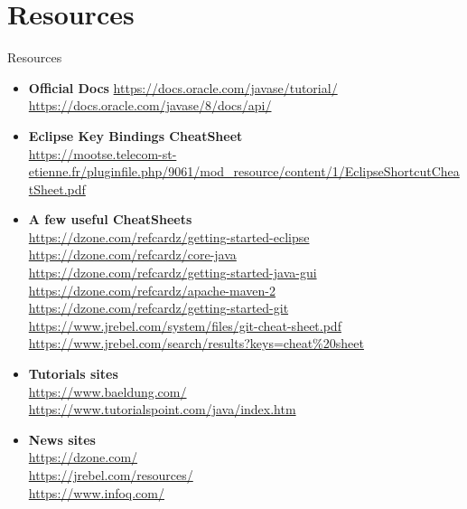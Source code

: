 \documentclass[English,c,%
hyperref={%
    pdftitle={FISA-DE2 OOP in Java},%
    pdfauthor={Muller, Gravier, Laforest, Subercaze},%
    pdfsubject={OOP in Java},%
    pdfkeywords={OOP, Java},%
    colorlinks=true,%
    urlcolor=blue,%
    linkcolor=%
    },%
xcolor={pdftex,svgnames} %
]{beamer}
\begin{document}
\section{Resources}

\begin{frame}{Resources}



{\tiny
\begin{itemize}

  \item \textbf{Official Docs}
  \url{https://docs.oracle.com/javase/tutorial/} \\
  \url{https://docs.oracle.com/javase/8/docs/api/}

  \item \textbf{Eclipse Key Bindings CheatSheet}\\
  \url{https://mootse.telecom-st-etienne.fr/pluginfile.php/9061/mod_resource/content/1/EclipseShortcutCheatSheet.pdf}

  \item \textbf{A few useful CheatSheets}\\
  \url{https://dzone.com/refcardz/getting-started-eclipse}\\
  \url{https://dzone.com/refcardz/core-java}\\
  \url{https://dzone.com/refcardz/getting-started-java-gui} \\
  \url{https://dzone.com/refcardz/apache-maven-2} \\
  \url{https://dzone.com/refcardz/getting-started-git} \\
  \url{https://www.jrebel.com/system/files/git-cheat-sheet.pdf}\\
  \url{https://www.jrebel.com/search/results?keys=cheat\%20sheet}

  \item \textbf{Tutorials sites}\\
  \url{https://www.baeldung.com/}\\
  \url{https://www.tutorialspoint.com/java/index.htm}\\

  \item \textbf{News sites}\\
  \url{https://dzone.com/}\\
  \url{https://jrebel.com/resources/}\\
  \url{https://www.infoq.com/}


\end{itemize}}
\end{frame}
\end{document}
